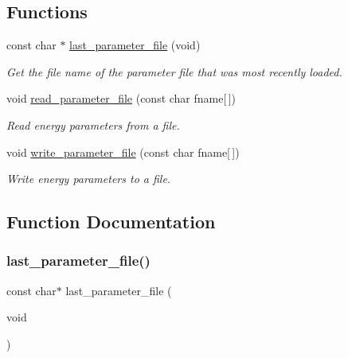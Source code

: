 \subsection*{Functions}
\begin{DoxyCompactItemize}
\item 
const char $\ast$ \hyperlink{group__energy__parameters__rw_ga5abafd7bad6d506e18bed13b18123cfe}{last\+\_\+parameter\+\_\+file} (void)
\begin{DoxyCompactList}\small\item\em Get the file name of the parameter file that was most recently loaded. \end{DoxyCompactList}\item 
void \hyperlink{group__energy__parameters__rw_ga165a142a3c68fb6655c69ef4ab7cd749}{read\+\_\+parameter\+\_\+file} (const char fname\mbox{[}$\,$\mbox{]})
\begin{DoxyCompactList}\small\item\em Read energy parameters from a file. \end{DoxyCompactList}\item 
void \hyperlink{group__energy__parameters__rw_ga8a43459be386a7489feeab68dc2c6c76}{write\+\_\+parameter\+\_\+file} (const char fname\mbox{[}$\,$\mbox{]})
\begin{DoxyCompactList}\small\item\em Write energy parameters to a file. \end{DoxyCompactList}\end{DoxyCompactItemize}


\subsection{Function Documentation}
\mbox{\label{group__energy__parameters__rw_ga5abafd7bad6d506e18bed13b18123cfe}} 
\subsubsection{\texorpdfstring{last\+\_\+parameter\+\_\+file()}{last\_parameter\_file()}}
{\footnotesize\ttfamily const char$\ast$ last\+\_\+parameter\+\_\+file (\begin{DoxyParamCaption}\item[{void}]{ }\end{DoxyParamCaption})}



